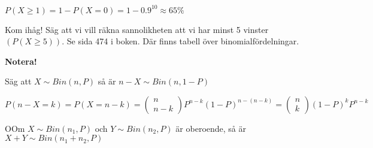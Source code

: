 \noindent $P(X\geq1) = 1-P(X=0) = 1-0.9^{10}\approx 65\%$
\par\bigskip
\noindent Kom ihåg! Säg att vi vill räkna sannolikheten att vi har minst 5 vinster $(P(X\geq5))$. Se sida 474 i boken. Där finns tabell över binomialfördelningar. 
\par\bigskip
\noindent\textbf{Notera!}\par
\noindent Säg att $X\sim Bin(n,P)$ så är $n-X\sim Bin(n, 1-P)$\par
\noindent $P(n-X = k) = P(X=n-k)= \begin{pmatrix}n\\n-k\end{pmatrix}P^{n-k}(1-P)^{n-(n-k)} = \begin{pmatrix}n\\k\end{pmatrix}(1-P)^kP^{n-k}$
\par\bigskip
\begin{theo}
  OOm $X\sim Bin(n_1,P)$ och $Y\sim Bin(n_2,P)$ är oberoende, så är $X+Y\sim Bin(n_1+n_2,P)$
\end{theo}
\newpage
